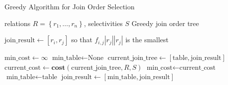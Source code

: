 \begin{algorithm}
\caption{Greedy Algorithm for Join Order Selection}
\label{alg:greedy-join-order}
\begin{algorithmic}[1]
\Require relations $R = \left\{ r_1, \ldots, r_n \right\}$, selectivities $S$
\Ensure Greedy join order tree

\State $\text{join\_result} \gets [r_i, r_j]$ so that $f_{i,j}|r_j||r_j|$ is the smallest

    \State $\text{min\_cost} \gets \infty$
    \State $\text{min\_table} \gets \text{None}$
     
        \State $\text{current\_join\_tree} \gets [\text{table}, \text{join\_result}]$
        \State $\text{current\_cost} \gets \textbf{cost}(\text{current\_join\_tree}, R, S)$
         
            \State $\text{min\_cost} \gets \text{current\_cost}$
            \State $\text{min\_table} \gets \text{table}$
        \EndIf
    \EndFor
    \State $\text{join\_result} \gets [\text{min\_table}, \text{join\_result}]$
\EndFor
\end{algorithmic}
\end{algorithm}